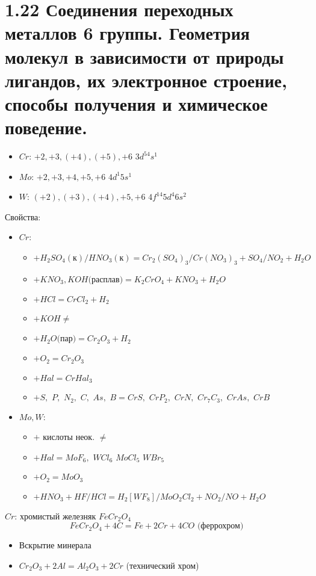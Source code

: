 \section*{1.22 Соединения переходных металлов 6 группы. Геометрия молекул в зависимости от природы лигандов, их электронное строение, способы получения и химическое поведение.}
\begin{itemize}
	\item $Cr$: $+2, +3, (+4), (+5), +6$ \quad \quad $3d^54s^1$
	\item $Mo$: $+2, +3, +4, +5, +6$ \quad $4d^1 5s^1$
	\item $W$: $(+2), (+3), (+4), +5, +6$ \quad $4f^{14} 5d^4 6s^2$
\end{itemize}
Свойства:
\begin{itemize}
	\item $Cr$:
	\begin{itemize}
		\item $+ H_2SO_4 (\text{к})/HNO_3(\text{к}) = Cr_2(SO_4)_3 / Cr(NO_3)_3 + SO_4/NO_2 + H_2O $
		\item $+ KNO_3, KOH \text{(расплав)} = K_2CrO_4 + KNO_3 + H_2O$
		\item $+ HCl = CrCl_2 + H_2$
		\item $+ KOH \not =$
		\item $+ H_2O \text{(пар)} = Cr_2O_3 + H_2$	
		\item $+ O_2 = Cr_2O_3$
		\item $+ Hal = CrHal_3 $
		\item $+ S, \,\, P, \,\, N_2, \,\, C, \,\, As, \,\, B = CrS, \,\, CrP_2, \,\, CrN,\,\, Cr_7C_3, \,\, CrAs,\,\, CrB $	
	\end{itemize}
	\item $Mo, W$:
	\begin{itemize}
		\item $+$ кислоты неок. $ \not = $
		\item $+ Hal = MoF_6, \,\, WCl_6 \,\, MoCl_5 \,\, WBr_5 $
		\item $+ O_2 = MoO_3$
		\item $+ HNO_3 + HF/HCl = H_2\left[WF_8 \right]/MoO_2Cl_2 + NO_2/NO + H_2O $		
	\end{itemize}
\end{itemize}
$Cr$: хромистый железняк $FeCr_2O_4$
\[
FeCr_2O_4 + 4C = Fe + 2Cr + 4CO \text{ (феррохром)}
\]
\begin{itemize}
	\item Вскрытие минерала
	\item $Cr_2O_3 + 2 Al = Al_2O_3 + 2 Cr$ (технический хром)
\end{itemize}

